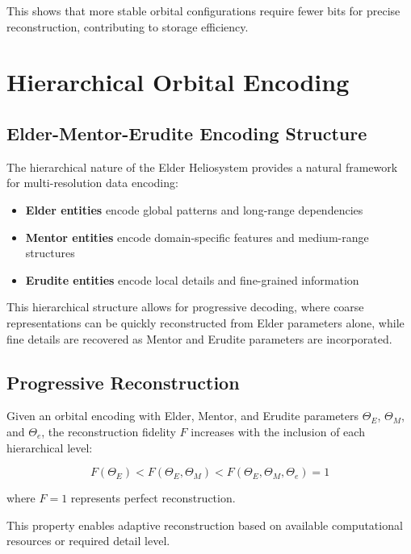 This shows that more stable orbital configurations require fewer bits for precise reconstruction, contributing to storage efficiency.

\section{Hierarchical Orbital Encoding}

\subsection{Elder-Mentor-Erudite Encoding Structure}

The hierarchical nature of the Elder Heliosystem provides a natural framework for multi-resolution data encoding:

\begin{itemize}
    \item \textbf{Elder entities} encode global patterns and long-range dependencies
    \item \textbf{Mentor entities} encode domain-specific features and medium-range structures
    \item \textbf{Erudite entities} encode local details and fine-grained information
\end{itemize}

This hierarchical structure allows for progressive decoding, where coarse representations can be quickly reconstructed from Elder parameters alone, while fine details are recovered as Mentor and Erudite parameters are incorporated.

\subsection{Progressive Reconstruction}

\begin{proposition}
Given an orbital encoding with Elder, Mentor, and Erudite parameters $\Theta_E$, $\Theta_M$, and $\Theta_e$, the reconstruction fidelity $F$ increases with the inclusion of each hierarchical level:

\begin{equation}
F(\Theta_E) < F(\Theta_E, \Theta_M) < F(\Theta_E, \Theta_M, \Theta_e) = 1
\end{equation}

where $F=1$ represents perfect reconstruction.
\end{proposition}

This property enables adaptive reconstruction based on available computational resources or required detail level.

